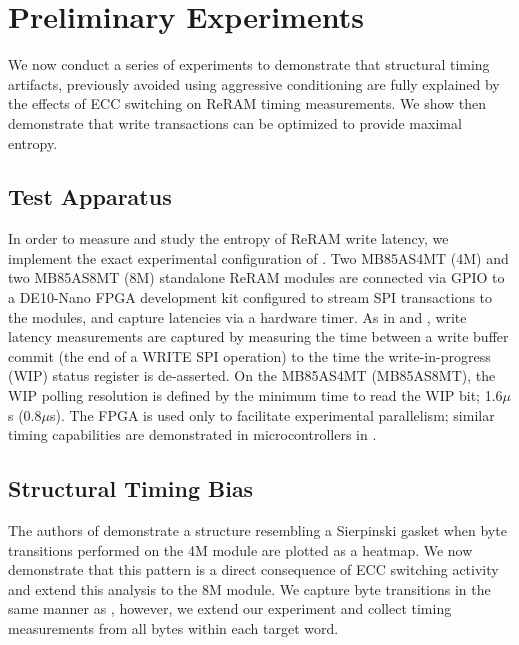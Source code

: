 

\section{Preliminary Experiments}

We now conduct a series of experiments to demonstrate that structural timing artifacts, previously avoided using aggressive conditioning are fully explained by the effects of ECC switching on ReRAM timing measurements.
We show then demonstrate that write transactions can be optimized to provide maximal entropy.

\subsection{Test Apparatus}
In order to measure and study the entropy of ReRAM write latency, we implement the exact experimental configuration of \cite{sheaves2026brewrc}. Two MB85AS4MT (4M) and two MB85AS8MT (8M) standalone ReRAM modules are connected via GPIO to a DE10-Nano FPGA development kit configured to stream SPI transactions to the modules, and capture latencies via a hardware timer. As in \cite{suri2018high, tolga2024trng} and \cite{sheaves2026brewrc}, write latency measurements are captured by measuring the time between a write buffer commit (the end of a WRITE SPI operation) to the time the write-in-progress (WIP) status register is de-asserted. On the MB85AS4MT (MB85AS8MT), the WIP polling resolution is defined by the minimum time to read the WIP bit; 1.6$\mu$s (0.8$\mu$s). The FPGA is used only to facilitate experimental parallelism; similar timing capabilities are demonstrated in microcontrollers in \cite{tolga2024trng}.

\subsection{Structural Timing Bias}
\label{sec:remove-structural}


The authors of \cite{tolga2024trng} demonstrate a structure resembling a Sierpinski gasket when byte transitions performed on the 4M module are plotted as a heatmap. We now demonstrate that this pattern is a direct consequence of ECC switching activity and extend this analysis to the 8M module. We capture byte transitions in the same manner as \cite{tolga2024trng}, however, we extend our experiment and collect timing measurements from all bytes within each target word. 

